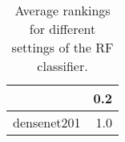 \begin{table}[H]
\centering
\caption{Average rankings for different settings of the RF classifier.}
\begin{tabular}{lr}
\toprule
{} &  0.2 \\
\midrule
densenet201 &  1.0 \\
\bottomrule
\end{tabular}
\label{tab:RF}
\end{table}
